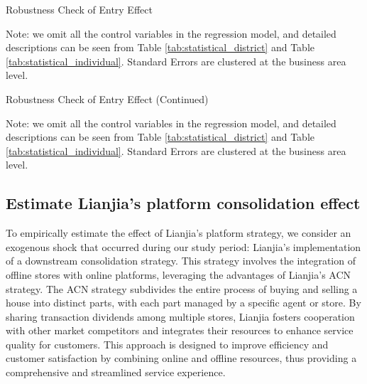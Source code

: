 \documentclass[11pt]{article}
\begin{document}
\begin{table}[H]
  \begin{center}
    \begin{scriptsize}
      \caption{Robustness Check of Entry Effect}
      \label{tab:entry_effect_robustness_1}
      
    
    Note: we omit all the control variables in the regression model, and detailed descriptions can be seen from Table \ref{tab:statistical_district} and Table \ref{tab:statistical_individual}. Standard Errors are clustered at the business area level.
    \end{scriptsize}
  \end{center}
\end{table}

\begin{table}[H]
  \begin{center}
    \begin{scriptsize}
      \caption{Robustness Check of Entry Effect (Continued)}
      \label{tab:entry_effect_robustness_2}
      
    
    Note: we omit all the control variables in the regression model, and detailed descriptions can be seen from Table \ref{tab:statistical_district} and Table \ref{tab:statistical_individual}. Standard Errors are clustered at the business area level.
    \end{scriptsize}
  \end{center}
\end{table}

\subsection{Estimate Lianjia's platform consolidation effect} \label{subsec:acn_strategy}

To empirically estimate the effect of Lianjia's platform strategy, we consider an exogenous shock that occurred during our study period: Lianjia's implementation of a downstream consolidation strategy. This strategy involves the integration of offline stores with online platforms, leveraging the advantages of Lianjia's ACN strategy. The ACN strategy subdivides the entire process of buying and selling a house into distinct parts, with each part managed by a specific agent or store. By sharing transaction dividends among multiple stores, Lianjia fosters cooperation with other market competitors and integrates their resources to enhance service quality for customers. This approach is designed to improve efficiency and customer satisfaction by combining online and offline resources, thus providing a comprehensive and streamlined service experience. 
\end{document}

